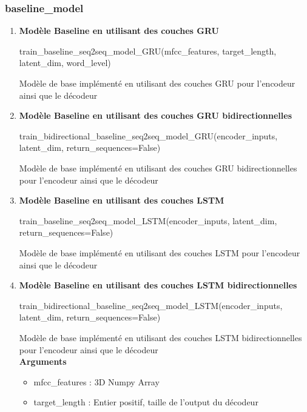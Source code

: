     \subsubsection{baseline\_model}
    \begin{enumerate}
        \item \textbf{Modèle Baseline en utilisant des couches GRU} 
            \begin{tcolorbox}
                train\_baseline\_seq2seq\_model\_GRU(mfcc\_features, target\_length, latent\_dim, word\_level)
            \end{tcolorbox}
            Modèle de base implémenté en utilisant des couches GRU pour l'encodeur ainsi que le décodeur \\
        \item \textbf{Modèle Baseline en utilisant des couches GRU bidirectionnelles}
            \begin{tcolorbox}
            train\_bidirectional\_baseline\_seq2seq\_model\_GRU(encoder\_inputs, latent\_dim, return\_sequences=False)
            \end{tcolorbox}
            Modèle de base implémenté en utilisant des couches GRU bidirectionnelles pour l'encodeur ainsi que le décodeur \\
        \item \textbf{Modèle Baseline en utilisant des couches LSTM} 
            \begin{tcolorbox}
            train\_baseline\_seq2seq\_model\_LSTM(encoder\_inputs, latent\_dim, return\_sequences=False)
            \end{tcolorbox}
            Modèle de base implémenté en utilisant des couches LSTM pour l'encodeur ainsi que le décodeur \\
        \item \textbf{Modèle Baseline en utilisant des couches LSTM  bidirectionnelles} 
            \begin{tcolorbox}
            train\_bidirectional\_baseline\_seq2seq\_model\_LSTM(encoder\_inputs, latent\_dim, return\_sequences=False)
            \end{tcolorbox}
            Modèle de base implémenté en utilisant des couches LSTM bidirectionnelles pour l'encodeur ainsi que le décodeur \\
            \textbf{Arguments} 
            \begin{itemize}
                \item mfcc\_features : 3D Numpy Array
                \item target\_length : Entier positif, taille de l'output du décodeur

\end{itemize}
\end{enumerate}

